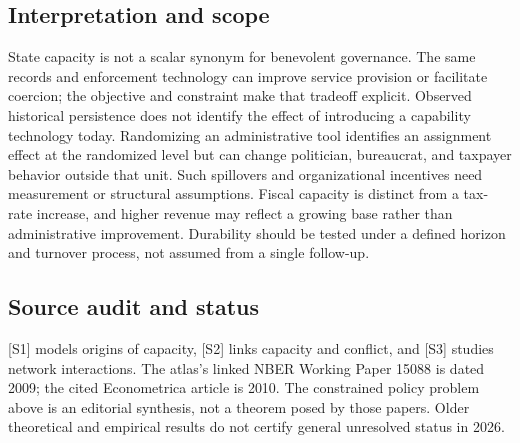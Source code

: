 \documentclass[11pt,a4paper]{article}
\begin{document}
\subsection*{Interpretation and scope}
State capacity is not a scalar synonym for benevolent governance. The same records and enforcement technology can improve service provision or facilitate coercion; the objective and constraint make that tradeoff explicit. Observed historical persistence does not identify the effect of introducing a capability technology today. Randomizing an administrative tool identifies an assignment effect at the randomized level but can change politician, bureaucrat, and taxpayer behavior outside that unit. Such spillovers and organizational incentives need measurement or structural assumptions. Fiscal capacity is distinct from a tax-rate increase, and higher revenue may reflect a growing base rather than administrative improvement. Durability should be tested under a defined horizon and turnover process, not assumed from a single follow-up.
\subsection*{Source audit and status}
[S1] models origins of capacity, [S2] links capacity and conflict, and [S3] studies network interactions. The atlas's linked NBER Working Paper 15088 is dated 2009; the cited Econometrica article is 2010. The constrained policy problem above is an editorial synthesis, not a theorem posed by those papers. Older theoretical and empirical results do not certify general unresolved status in 2026.
\end{document}
